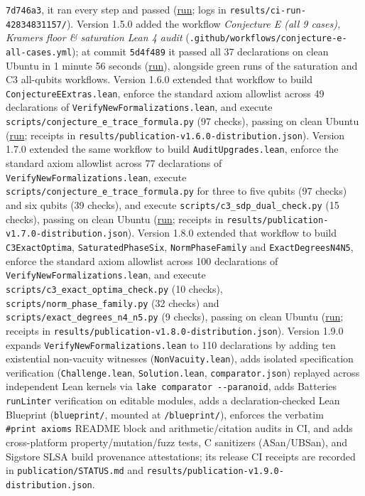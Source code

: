 \documentclass[11pt,a4paper]{article}
\begin{document}
\texttt{7d746a3}, it ran every step and passed (\href{https://github.com/0thernes/hoggar-bound-lab/actions/runs/42834831157}{run}; logs in
\nolinkurl{results/ci-run-42834831157/}). Version 1.5.0 added the workflow \emph{Conjecture E (all 9 cases), Kramers
floor \& saturation Lean 4 audit} (\nolinkurl{.github/workflows/conjecture-e-all-cases.yml}); at commit \texttt{5d4f489}
it passed all 37 declarations on clean Ubuntu in 1 minute 56 seconds
(\href{https://github.com/0thernes/hoggar-bound-lab/actions/runs/44888403135}{run}), alongside green runs of
the saturation and C3 all-qubits workflows. Version 1.6.0 extended that workflow to build \nolinkurl{ConjectureEExtras.lean}, enforce the standard axiom
allowlist across 49 declarations of \nolinkurl{VerifyNewFormalizations.lean}, and execute
\nolinkurl{scripts/conjecture_e_trace_formula.py} (97 checks), passing on clean Ubuntu
(\href{https://github.com/0thernes/hoggar-bound-lab/actions/runs/44893871335}{run}; receipts in
\nolinkurl{results/publication-v1.6.0-distribution.json}). Version 1.7.0 extended the same workflow to build \nolinkurl{AuditUpgrades.lean}, enforce the standard axiom
allowlist across 77 declarations of \nolinkurl{VerifyNewFormalizations.lean}, execute \nolinkurl{scripts/conjecture_e_trace_formula.py}
for three to five qubits (97 checks) and six qubits (39 checks), and execute \nolinkurl{scripts/c3_sdp_dual_check.py}
(15 checks), passing on clean Ubuntu (\href{https://github.com/0thernes/hoggar-bound-lab/actions/runs/44908422882}{run};
receipts in \nolinkurl{results/publication-v1.7.0-distribution.json}). Version 1.8.0 extended that workflow to build
\texttt{C3ExactOptima}, \texttt{SaturatedPhaseSix}, \texttt{NormPhaseFamily} and \texttt{ExactDegreesN4N5}, enforce the standard
axiom allowlist across 100 declarations of \nolinkurl{VerifyNewFormalizations.lean}, and execute
\nolinkurl{scripts/c3_exact_optima_check.py} (10 checks), \nolinkurl{scripts/norm_phase_family.py} (32 checks) and
\nolinkurl{scripts/exact_degrees_n4_n5.py} (9 checks), passing on clean Ubuntu
(\href{https://github.com/0thernes/hoggar-bound-lab/actions/runs/44959312365}{run}; receipts in
\nolinkurl{results/publication-v1.8.0-distribution.json}). Version 1.9.0 expands \nolinkurl{VerifyNewFormalizations.lean} to
110 declarations by adding ten existential non-vacuity witnesses (\texttt{NonVacuity.lean}), adds isolated
specification verification (\texttt{Challenge.lean}, \texttt{Solution.lean}, \texttt{comparator.json}) replayed across
independent Lean kernels via \texttt{lake\ comparator\ -\/-paranoid}, adds Batteries \texttt{runLinter} verification on
editable modules, adds a declaration-checked Lean Blueprint (\texttt{blueprint/}, mounted at \texttt{/blueprint/}),
enforces the verbatim \texttt{\#print\ axioms} README block and arithmetic/citation audits in CI, and adds
cross-platform property/mutation/fuzz tests, C sanitizers (ASan/UBSan), and Sigstore SLSA build
provenance attestations; its release CI receipts are recorded in \nolinkurl{publication/STATUS.md} and
\nolinkurl{results/publication-v1.9.0-distribution.json}.
\end{document}
